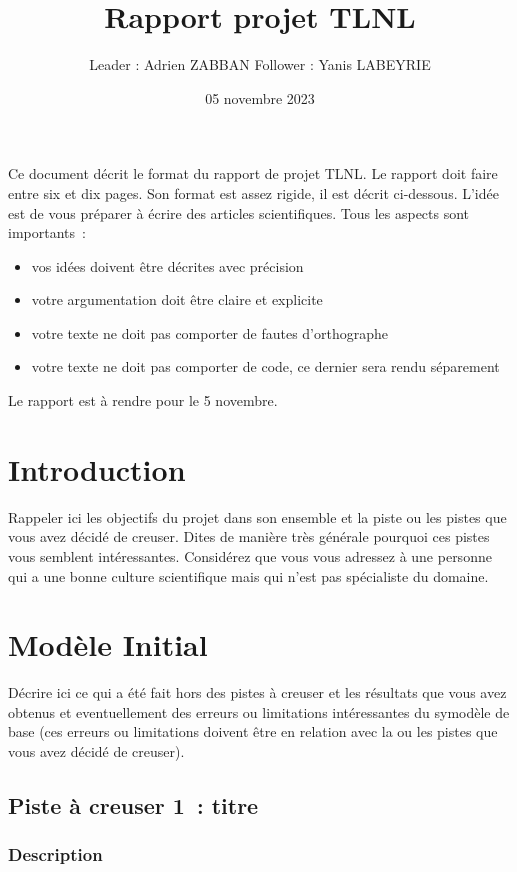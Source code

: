 \documentclass[a4paper]{article}
\title{Rapport projet TLNL}
\author{Leader : Adrien ZABBAN Follower : Yanis LABEYRIE}
\date{05 novembre 2023}
\begin{document}
\maketitle
Ce document décrit le format du rapport de projet TLNL. Le rapport doit faire entre six et dix pages.
Son format est assez rigide, il est décrit ci-dessous. L'idée est de vous préparer à écrire des articles scientifiques.
Tous les aspects sont importants~:
\begin{itemize}
\item vos idées doivent être décrites avec précision
\item votre argumentation doit être claire et explicite
\item votre texte ne doit pas comporter de fautes d'orthographe
\item votre texte ne doit pas comporter de code, ce dernier sera rendu séparement
  
\end{itemize}

Le rapport est à rendre pour le 5 novembre.

\section{Introduction}

Rappeler ici les objectifs du projet dans son ensemble et la piste ou les pistes que vous avez décidé de creuser. Dites de manière très générale pourquoi ces pistes vous semblent intéressantes. Considérez que vous vous adressez à une personne qui a une bonne culture scientifique mais qui n'est pas spécialiste du domaine.

\section{Modèle Initial}

Décrire ici ce qui a été fait hors des pistes à creuser et les résultats que vous avez obtenus et eventuellement des erreurs ou limitations intéressantes du symodèle de base (ces erreurs ou limitations doivent être en relation avec la ou les pistes que vous avez décidé de creuser).

\subsection{Piste à creuser 1~: titre}

\subsubsection{Description}
\end{document}
